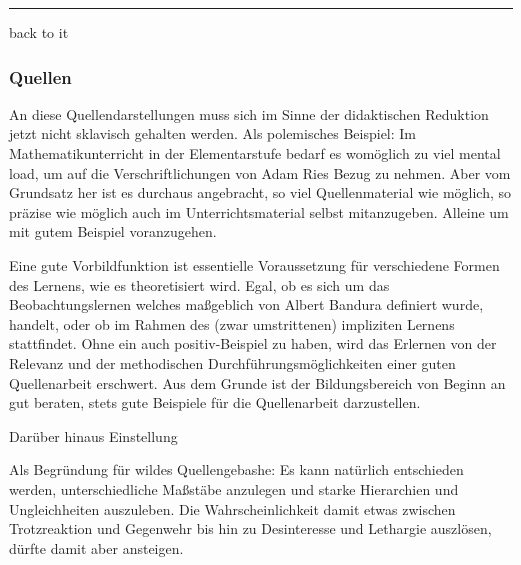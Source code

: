 \vspace{12pt}
\hrule
\vspace{12pt}

back to it


\subsubsection{Quellen}

An diese Quellendarstellungen muss sich im Sinne der didaktischen Reduktion jetzt nicht sklavisch gehalten werden.
Als polemisches Beispiel: Im Mathematikunterricht in der Elementarstufe bedarf es womöglich zu viel mental load, um auf die Verschriftlichungen von Adam Ries Bezug zu nehmen. Aber vom Grundsatz her ist es durchaus angebracht, so viel Quellenmaterial wie möglich, so präzise wie möglich auch im Unterrichtsmaterial selbst mitanzugeben. Alleine um mit gutem Beispiel voranzugehen. 


Eine gute Vorbildfunktion ist essentielle Voraussetzung für verschiedene Formen des Lernens, wie es theoretisiert wird.
Egal, ob es sich um das Beobachtungslernen \autocite[73ff.]{Kiesel2012} welches maßgeblich von Albert Bandura definiert wurde, handelt, oder ob im Rahmen des (zwar umstrittenen) impliziten Lernens \autocite[83ff.]{Kiesel2012} stattfindet. Ohne ein auch positiv-Beispiel zu haben, wird das Erlernen von der Relevanz und der methodischen Durchführungsmöglichkeiten einer guten Quellenarbeit erschwert. Aus dem Grunde ist der Bildungsbereich von Beginn an gut beraten, stets gute Beispiele für die Quellenarbeit darzustellen. 


Darüber hinaus Einstellung \autocite[130]{Kiesel2012}



Als Begründung für wildes Quellengebashe:
Es kann natürlich entschieden werden, unterschiedliche Maßstäbe anzulegen und starke Hierarchien und Ungleichheiten auszuleben. Die Wahrscheinlichkeit damit etwas zwischen Trotzreaktion und Gegenwehr bis hin zu Desinteresse und Lethargie auszlösen, dürfte damit aber ansteigen. 




